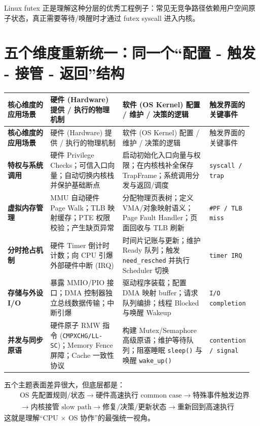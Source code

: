 \documentclass[11pt,a4paper]{ctexart}
\newcommand{\code}[1]{\texttt{#1}}
\begin{document}
Linux futex 正是理解这种分层的优秀工程例子：常见无竞争路径依赖用户空间原子状态，真正需要等待/唤醒时才通过 futex syscall 进入内核。

\section{五个维度重新统一：同一个“配置 - 触发 - 接管 - 返回”结构}

\begingroup
\small
\renewcommand{\arraystretch}{1.25}
\begin{longtable}{>{\bfseries}p{0.18\linewidth} p{0.3\linewidth} p{0.36\linewidth} p{0.12\linewidth}}
\toprule
核心维度的应用场景 & 硬件 (Hardware) 提供 / 执行的物理机制 & 软件 (OS Kernel) 配置 / 维护 / 决策的逻辑 & 触发界面的关键事件\\
\midrule
\endfirsthead
\toprule
核心维度的应用场景 & 硬件 (Hardware) 提供 / 执行的物理机制 & 软件 (OS Kernel) 配置 / 维护 / 决策的逻辑 & 触发界面的关键事件\\
\midrule
\endhead
特权与系统调用 & 硬件 Privilege Checks；可信入口向量；自动切换内核栈并保护基础断点 & 启动初始化入口向量与权限；在内核栈补全保存 TrapFrame；系统调用分发与返回/调度 & \code{syscall / trap}\\
虚拟内存管理 & MMU 自动硬件 Page Walk；TLB 映射缓存；PTE 权限校验；产生缺页异常 & 分配物理页表树；定义 VMA/对象映射语义；Page Fault Handler；页面回收与 TLB 刷新 & \code{\#PF / TLB miss}\\
分时抢占机制 & 硬件 Timer 倒计时计数；向 CPU 引爆外部硬件中断 (IRQ) & 时间片记账与更新；维护 Ready 队列；触发 \code{need\_resched} 并执行 Scheduler 切换 & \code{timer IRQ}\\
存储与外设 I/O & 暴露 MMIO/PIO 接口；DMA 控制器独立总线数据传输；中断引爆 & 驱动程序装载；配置 DMA 映射 buffer；请求队列编排；线程 Blocked 与唤醒 Wakeup & \code{I/O completion}\\
并发与同步原语 & 硬件原子 RMW 指令 (\code{CMPXCHG/LL-SC})；Memory Fence 屏障；Cache 一致性协议 & 构建 Mutex/Semaphore 高级原语；维护等待队列；阻塞睡眠 \code{sleep()} 与唤醒 \code{wake\_up()} & \code{contention / signal}\\
\bottomrule
\end{longtable}
\endgroup

\begin{corebox}[真正统一的结构]
五个主题表面差异很大，但底层都是：
\[
\boxed{
\begin{aligned}
&\text{OS 先配置规则/状态}\rightarrow\text{硬件高速执行 common case}\rightarrow\text{特殊事件触发边界}\\
&\rightarrow\text{内核接管 slow path}\rightarrow\text{修复/决策/更新状态}\rightarrow\text{重新回到高速执行}
\end{aligned}
}
\]
这就是理解“CPU × OS 协作”的最强统一视角。
\end{corebox}
\end{document}
